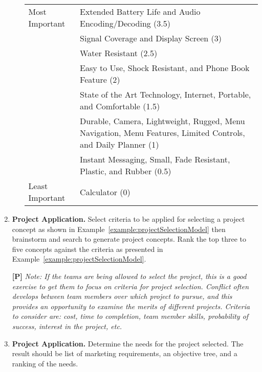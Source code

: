 \begin{enumerate}
\begin{onlysolution}
\begin{enumerate}
\begin{tabular}{ll}
Most Important 	& Extended Battery Life and Audio Encoding/Decoding (3.5)			\\ 	
 & Signal Coverage and Display Screen (3)			\\    	
 &Water Resistant (2.5)			\\ 	
 & Easy to Use, Shock Resistant, and Phone Book Feature (2)			\\ 	
 & State of the Art Technology, Internet, Portable, and Comfortable (1.5)			\\  	
 &Durable, Camera, Lightweight, Rugged, Menu Navigation, Menu Features, Limited Controls, and Daily Planner (1)			\\ 	
& Instant Messaging, Small, Fade Resistant, Plastic, and Rubber (0.5)			\\ 	
Least Important & Calculator (0)			\\ 	
\end{tabular}


  \end{enumerate}
  \end{onlysolution}

\item
  \textbf{Project Application.} Select criteria to be applied for
  selecting a project concept as shown in Example~\ref{example:projectSelectionModel}
  then brainstorm and search to generate project concepts. Rank the top three to five
  concepts against the criteria as presented in Example~\ref{example:projectSelectionModel}.

  \begin{onlysolution}
  \textbf{[P]}
  \itshape
  \emph{Note:} If the teams are being allowed to select the project, this is a good exercise 
  to get them to focus on criteria for project selection. Conflict often develops between 
  team members over which project to pursue, and this provides an opportunity to examine the 
  merits of different projects. Criteria to consider are: cost, time to completion, team member 
  skills, probability of success, interest in the project, etc.
  \end{onlysolution}

\item
  \textbf{Project Application.} Determine the needs for the project
  selected. The result should be list of marketing requirements, an
  objective tree, and a ranking of the needs.


\end{enumerate}
